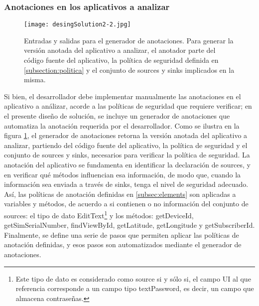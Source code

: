 \subsubsection{Anotaciones en los aplicativos a analizar}
\label{subsec:anotador}
\begin{figure}[t!]
	\begin{center}
	\texttt{[image: desingSolution2-2.jpg]}
	\end{center}
	\caption{Entradas y salidas para el generador de anotaciones.\newline
	Para generar la versión anotada del aplicativo a analizar, el anotador parte
	del código fuente del aplicativo, la política de seguridad definida en
	\ref{subsection:politica} y el conjunto de sources y sinks implicados en la misma.}
	\label{fig:desingSolution}
\end{figure}
Si bien, el desarrollador debe implementar manualmente las anotaciones en el
aplicativo a análizar, acorde a las políticas de seguridad que requiere
verificar; en el presente diseño de solución, se incluye un generador de
anotaciones que automatiza la anotación requerida por el desarrollador. Como se
ilustra en la figura \ref{fig:desingSolution}, el generador de anotaciones
retorna la versión anotada del aplicativo a analizar, partiendo del código
fuente del aplicativo, la política de seguridad y el conjunto de sources y
sinks, necesarios para verificar la política de seguridad.\newline
La anotación del aplicativo se fundamenta en identificar la declaración de
sources, y en verificar qué métodos influencian esa información, de modo que,
cuando la información sea enviada a través de sinks, tenga el nivel de seguridad
adecuado. Así, las políticas de anotación definidas en \ref{subsec:elements} son
aplicadas a variables y métodos, de acuerdo a si contienen o no información del
conjunto de sources: el tipo de dato EditText\footnote{Este tipo de
dato es considerado como source si y sólo si, el campo UI al que referencia
corresponde a un campo tipo textPassword, es decir, un campo que almacena
contraseñas.} y los métodos: getDeviceId, getSimSerialNumber, findViewById,
getLatitude, getLongitude y getSubscriberId.\newline
Finalmente, se define una serie de pasos que permiten aplicar las políticas de
anotación definidas, y esos pasos son automatizados mediante el generador de
anotaciones.












